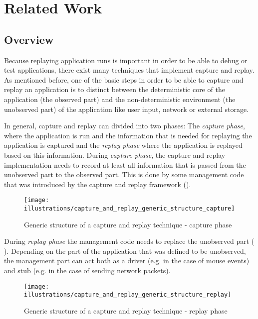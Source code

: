 \chapter{Related Work}
\section{Overview}
Because replaying application runs is important in order to be able to debug or test applications, there exist many techniques that implement capture and replay. As mentioned before, one of the basic steps in order to be able to capture and replay an application is to distinct between the deterministic core of the application (the observed part) and the non-deterministic environment (the unobserved part) of the application like user input, network or external storage.

In general, capture and replay can divided into two phases: The \emph{capture phase}, where the application is run and the information that is needed for replaying the application is captured and the \emph{replay phase} where the application is replayed based on this information.
During \emph{capture phase}, the capture and replay implementation needs to record at least all information that is passed from the unobserved part to the observed part. This is done by some management code that was introduced by the capture and replay framework ().
\begin{figure}[h]
  \centering
  \texttt{[image: illustrations/capture\_and\_replay\_generic\_structure\_capture]}
  \caption{Generic structure of a capture and replay technique - capture phase}
  \label{fig:GenericCrStructure_capture}
\end{figure}

During \emph{replay phase} the management code needs to replace the unobserved part ( 
). Depending on the part of the application that was defined to be unobserved, the management part can act both as a driver (e.g. in the case of mouse events) and stub (e.g. in the case of sending network packets). 
\begin{figure}[h]
  \centering
  \texttt{[image: illustrations/capture\_and\_replay\_generic\_structure\_replay]}
  \caption{Generic structure of a capture and replay technique - replay phase}
  \label{fig:GenericCrStructure_replay}
\end{figure}

